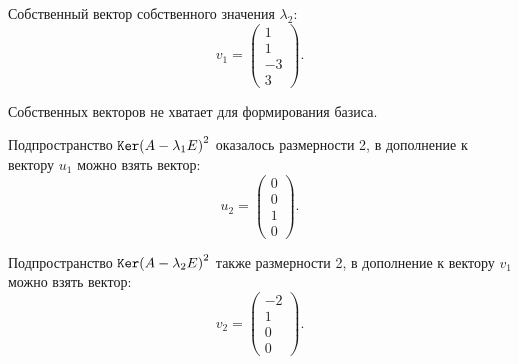 \documentclass[12pt]{article}
\begin{document}
    Собственный вектор собственного значения $\lambda_2$:
    \[
        v_1 = \begin{pmatrix}
                  1 \\ 1 \\ -3 \\ 3
        \end{pmatrix}
        .
    \]

    Собственных векторов не хватает для формирования базиса.

    Подпространство $\mathtt{Ker}{\left ( A - \lambda_1 E\right )^2}$ оказалось размерности 2, в дополнение к вектору $u_1$ можно взять вектор:
    \[
        u_2 = \begin{pmatrix}
                  0 \\ 0 \\ 1 \\ 0
        \end{pmatrix}
        .
    \]

    Подпространство $\mathtt{Ker}{\left ( A - \lambda_2 E\right )^2}$ также размерности 2, в дополнение к вектору $v_1$ можно взять вектор:
    \[
        v_2 = \begin{pmatrix}
                  -2 \\ 1 \\ 0 \\ 0
        \end{pmatrix}
        .
    \]
\end{document}
